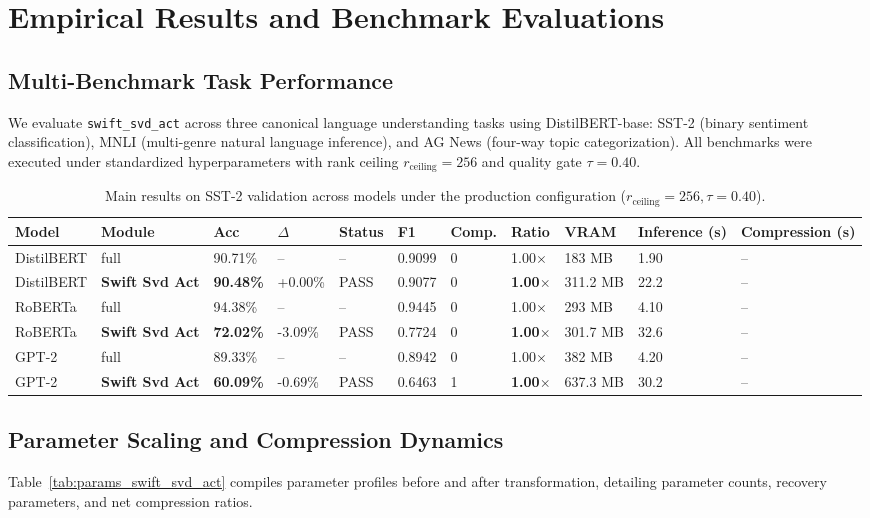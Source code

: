 \section{Empirical Results and Benchmark Evaluations}
\label{sec:results}

\subsection{Multi-Benchmark Task Performance}
We evaluate \texttt{swift\_svd\_act} across three canonical language understanding tasks using DistilBERT-base: SST-2 (binary sentiment classification), MNLI (multi-genre natural language inference), and AG News (four-way topic categorization). All benchmarks were executed under standardized hyperparameters with rank ceiling $r_{\mathrm{ceiling}} = 256$ and quality gate $\tau = 0.40$.

\begin{table}[t]
\centering
\small
\begin{tabular}{lllllllllll}
\toprule
\textbf{Model} & \textbf{Module} & \textbf{Acc} & \textbf{$\Delta$} & \textbf{Status} & \textbf{F1} & \textbf{Comp.} & \textbf{Ratio} & \textbf{VRAM} & \textbf{Inference (s)} & \textbf{Compression (s)} \\
\midrule
DistilBERT & full & 90.71\% & -- & -- & 0.9099 & 0 & 1.00$\times$ & 183 MB & 1.90 & -- \\
DistilBERT & \textbf{Swift Svd Act} & \textbf{90.48\%} & +0.00\% & PASS & 0.9077 & 0 & \textbf{1.00$\times$} & 311.2 MB & 22.2 & -- \\
RoBERTa & full & 94.38\% & -- & -- & 0.9445 & 0 & 1.00$\times$ & 293 MB & 4.10 & -- \\
RoBERTa & \textbf{Swift Svd Act} & \textbf{72.02\%} & -3.09\% & PASS & 0.7724 & 0 & \textbf{1.00$\times$} & 301.7 MB & 32.6 & -- \\
GPT-2 & full & 89.33\% & -- & -- & 0.8942 & 0 & 1.00$\times$ & 382 MB & 4.20 & -- \\
GPT-2 & \textbf{Swift Svd Act} & \textbf{60.09\%} & -0.69\% & PASS & 0.6463 & 1 & \textbf{1.00$\times$} & 637.3 MB & 30.2 & -- \\
\bottomrule
\end{tabular}
\caption{Main results on SST-2 validation across models under the production configuration ($r_{\mathrm{ceiling}}=256, \tau=0.40$).}
\label{tab:main_sst2}
\end{table}

\subsection{Parameter Scaling and Compression Dynamics}
Table~\ref{tab:params_swift_svd_act} compiles parameter profiles before and after transformation, detailing parameter counts, recovery parameters, and net compression ratios.

